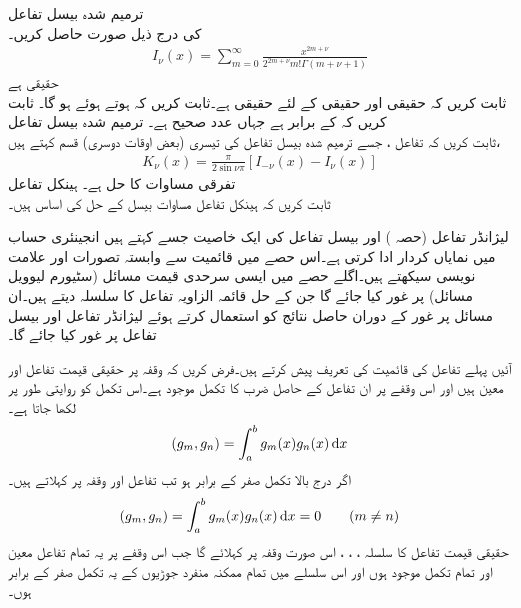 \quad ترمیم شدہ بیسل تفاعل\\
 کی درج ذیل صورت حاصل کریں۔
\begin{align}
I_{\nu}(x)=\sum_{m=0}^{\infty}\frac{x^{2m+\nu}}{2^{2m+\nu}m!\Gamma(m+\nu+1)}
\end{align}
\quad {} حقیقی ہے\\
ثابت کریں کہ حقیقی  اور حقیقی  کے لئے  حقیقی ہے۔ثابت کریں کہ  ہوتے ہوئے  ہو گا۔ ثابت کریں کہ  کے برابر ہے جہاں  عدد صحیح ہے۔
\quad ترمیم شدہ بیسل تفاعل\\
ثابت کریں کہ تفاعل ، جسے ترمیم شدہ بیسل تفاعل کی تیسری (بعض اوقات دوسری) قسم کہتے ہیں،
\begin{align}
K_{\nu}(x)=\frac{\pi}{2\sin \nu\pi}[I_{-\nu}(x)-I_{\nu}(x)]
\end{align}
تفرقی مساوات  کا حل ہے۔ 
\quad ہینکل تفاعل\\
ثابت کریں کہ ہینکل تفاعل  مساوات بیسل کے حل کی اساس ہیں۔ 

لیژانڈر تفاعل (حصہ ) اور بیسل تفاعل کی ایک خاصیت جسے  کہتے ہیں انجینئری حساب میں نمایاں کردار ادا کرتی ہے۔اس حصے میں قائمیت سے وابستہ تصورات اور  علامت نویسی سیکھتے ہیں۔اگلے حصے میں  ایسی سرحدی قیمت مسائل (سٹیورم لیوویل مسائل) پر غور کیا جائے گا جن کے حل قائمہ الزاویہ تفاعل کا سلسلہ دیتے ہیں۔ان مسائل  پر غور کے دوران حاصل نتائج کو استعمال کرتے ہوئے لیژانڈر تفاعل اور بیسل تفاعل پر غور کیا جائے گا۔

آئیں پہلے تفاعل کی قائمیت کی تعریف پیش کرتے ہیں۔فرض کریں کہ وقفہ  پر حقیقی قیمت تفاعل  اور  معین ہیں اور اس وقفے پر ان تفاعل کے حاصل ضرب  کا تکمل موجود ہے۔اس تکمل کو روایتی طور پر  لکھا جاتا ہے۔
\begin{align}
(g_m,g_n)=\int_{a}^{b} g_m(x)g_n(x)\dif x
\end{align}
اگر درج بالا تکمل صفر کے برابر ہو تب تفاعل  اور  وقفہ  پر   کہلاتے ہیں۔
\begin{align}
(g_m,g_n)=\int_{a}^{b} g_m(x)g_n(x)\dif x=0\quad \quad (m \ne n)
\end{align}
حقیقی قیمت تفاعل کا سلسلہ ، ، ،  اس صورت وقفہ   پر   کہلائے گا جب اس وقفے پر یہ تمام تفاعل معین اور تمام تکمل  موجود ہوں اور اس سلسلے میں تمام ممکنہ منفرد جوڑیوں کے یہ تکمل صفر کے برابر ہوں۔ 

